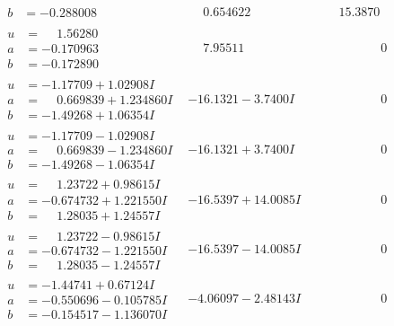 \documentclass[1p]{elsarticle_modified}
\theoremstyle{definition}
\begin{document}
$$\begin{array}{c|c|c}
\begin{aligned}
b &= -0.288008\phantom{ +0.000000I}\end{aligned}
 & \phantom{-}0.654622\phantom{ +0.000000I} & \phantom{-}15.3870\phantom{ +0.000000I} \\ \hline\begin{aligned}
u &= \phantom{-}1.56280\phantom{ +0.000000I} \\
a &= -0.170963\phantom{ +0.000000I} \\
b &= -0.172890\phantom{ +0.000000I}\end{aligned}
 & \phantom{-}7.95511\phantom{ +0.000000I} & \phantom{-0.000000 } 0 \\ \hline\begin{aligned}
u &= -1.17709 + 1.02908 I \\
a &= \phantom{-}0.669839 + 1.234860 I \\
b &= -1.49268 + 1.06354 I\end{aligned}
 & -16.1321 - 3.7400 I & \phantom{-0.000000 } 0 \\ \hline\begin{aligned}
u &= -1.17709 - 1.02908 I \\
a &= \phantom{-}0.669839 - 1.234860 I \\
b &= -1.49268 - 1.06354 I\end{aligned}
 & -16.1321 + 3.7400 I & \phantom{-0.000000 } 0 \\ \hline\begin{aligned}
u &= \phantom{-}1.23722 + 0.98615 I \\
a &= -0.674732 + 1.221550 I \\
b &= \phantom{-}1.28035 + 1.24557 I\end{aligned}
 & -16.5397 + 14.0085 I & \phantom{-0.000000 } 0 \\ \hline\begin{aligned}
u &= \phantom{-}1.23722 - 0.98615 I \\
a &= -0.674732 - 1.221550 I \\
b &= \phantom{-}1.28035 - 1.24557 I\end{aligned}
 & -16.5397 - 14.0085 I & \phantom{-0.000000 } 0 \\ \hline\begin{aligned}
u &= -1.44741 + 0.67124 I \\
a &= -0.550696 - 0.105785 I \\
b &= -0.154517 - 1.136070 I\end{aligned}
 & -4.06097 - 2.48143 I & \phantom{-0.000000 } 0 \\ \hline\begin{aligned}

\end{aligned}
\end{array}$$
\end{document}
